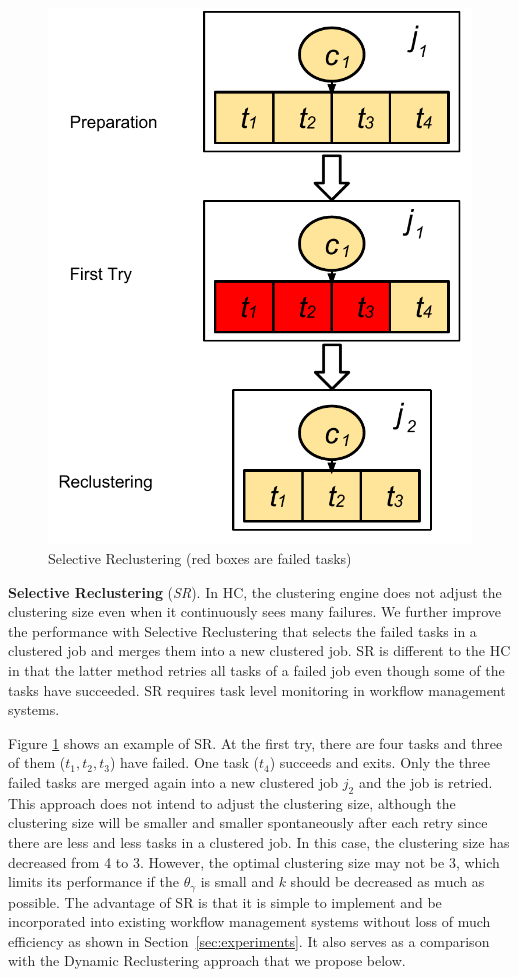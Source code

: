 \documentclass{IOS-Book-Article}
\begin{document}
\begin{figure}[!htb]
\centering
  \includegraphics[width=0.55\linewidth]{sr.pdf}
  \caption{Selective Reclustering (red boxes are failed tasks)}
  \label{fig:clustering_sr}
\end{figure}

\textbf{Selective Reclustering} (\emph{SR}). In HC, the clustering engine does not adjust the clustering size even when it continuously sees many failures. We further improve the performance with Selective Reclustering that selects the failed tasks in a clustered job and merges them into a new clustered job. SR is different to the HC in that the latter method retries all tasks of a failed job even though some of the tasks have succeeded. SR requires task level monitoring in workflow management systems. 

Figure \ref{fig:clustering_sr} shows an example of SR. At the first try, there are four tasks and three of them ($t_1, t_2, t_3$) have failed. One task ($t_4$) succeeds and exits. Only the three failed tasks are merged again into a new clustered job $j_2$ and the job is retried. This approach does not intend to adjust the clustering size, although the clustering size will be smaller and smaller spontaneously after each retry since there are less and less tasks in a clustered job. In this case, the clustering size has decreased from 4 to 3. However, the optimal clustering size may not be 3, which limits its performance if the $\theta_{\gamma}$ is small and $k$ should be decreased as much as possible. The advantage of SR is that it is simple to implement and be incorporated into existing workflow management systems without loss of much efficiency as shown in Section~\ref{sec:experiments}. It also serves as a comparison with the Dynamic Reclustering approach that we propose below. 
 
\end{document}
